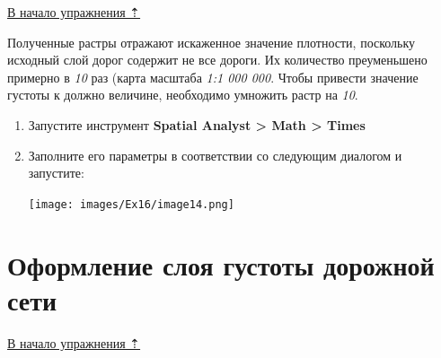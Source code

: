 \documentclass[12pt,]{book}
\begin{document}
\protect\hyperlink{density-analysis}{В начало упражнения ⇡}

Полученные растры отражают искаженное значение плотности, поскольку исходный слой дорог содержит не все дороги. Их количество преуменьшено примерно в \emph{10} раз (карта масштаба \emph{1:1 000 000}. Чтобы привести значение густоты к должно величине, необходимо умножить растр на \emph{10}.

\begin{enumerate}
\def\labelenumi{\arabic{enumi}.}
\item
  Запустите инструмент \textbf{Spatial Analyst \textgreater{} Math \textgreater{} Times}
\item
  Заполните его параметры в соответствии со следующим диалогом и запустите:

  \texttt{[image: images/Ex16/image14.png]}
\end{enumerate}

\hypertarget{density-analysis-layer}{%
\section{Оформление слоя густоты дорожной сети}\label{density-analysis-layer}}

\protect\hyperlink{density-analysis}{В начало упражнения ⇡}
\end{document}
